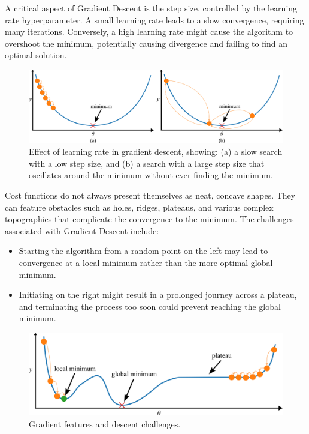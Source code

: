 \documentclass[12pt,letter]{article}
\begin{document}
A critical aspect of Gradient Descent is the step size, controlled by the learning rate hyperparameter. A small learning rate leads to a slow convergence, requiring many iterations. Conversely, a high learning rate might cause the algorithm to overshoot the minimum, potentially causing divergence and failing to find an optimal solution.

\begin{figure}[H]
    \centering
    \includegraphics[]{../figures/gradient_descent_2}
    \caption{Effect of learning rate in gradient descent, showing: (a) a slow search with a low step size, and (b) a search with a large step size that oscillates around the minimum without ever finding the minimum.}
    \label{fig:gradient_descent_2}
\end{figure}



Cost functions do not always present themselves as neat, concave shapes. They can feature obstacles such as holes, ridges, plateaus, and various complex topographies that complicate the convergence to the minimum. The challenges associated with Gradient Descent include:
\begin{itemize}
\item Starting the algorithm from a random point on the left may lead to convergence at a local minimum rather than the more optimal global minimum.
\item Initiating on the right might result in a prolonged journey across a plateau, and terminating the process too soon could prevent reaching the global minimum.
\end{itemize}

\begin{figure}[H]
    \centering
    \includegraphics[]{../figures/gradient_descent_3}
    \caption{Gradient features and descent challenges.}
    \label{fig:gradient_descent_3}
\end{figure}
\end{document}
